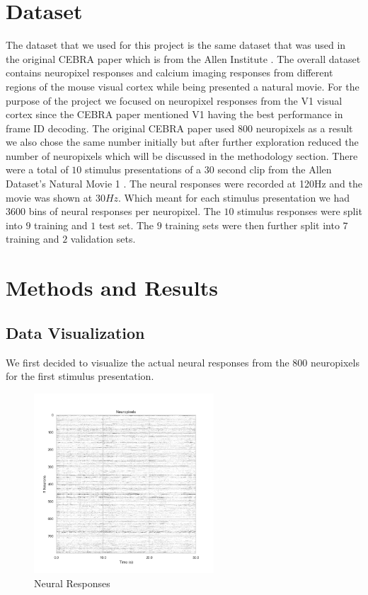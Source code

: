 \documentclass[12pt, letterpaper]{article}
\begin{document}
\section{Dataset}
\label{sec:dataset}
The dataset that we used for this project is the same dataset that was used in the original CEBRA \cite{schneider2023} paper which is from the Allen Institute \cite{siegle2021}. The overall dataset contains neuropixel responses and calcium imaging responses from different regions of the mouse visual cortex while being presented a natural movie. For the purpose of the project we focused on neuropixel responses from the V1 visual cortex since the CEBRA \cite{schneider2023} paper mentioned V1 having the best performance in frame ID decoding. The original CEBRA \cite{schneider2023} paper used $800$ neuropixels as a result we also chose the same number initially but after further exploration reduced the number of neuropixels which will be discussed in the methodology section. There were a total of $10$ stimulus presentations of a $30$ second clip from the Allen Dataset's Natural Movie 1 \cite{siegle2021}. The neural responses were recorded at 120Hz and the movie was shown at $30Hz$. Which meant for each stimulus presentation we had $3600$ bins of neural responses per neuropixel. The $10$ stimulus responses were split into $9$ training and $1$ test set. The $9$ training sets were then further split into $7$ training and $2$ validation sets. 

\section{Methods and Results}
\label{sec:methods_and_results}
\subsection{Data Visualization}
\label{subsec:data_visualization}
We first decided to visualize the actual neural responses from the 800 neuropixels for the first stimulus presentation. 

\begin{figure}[H]
    \centering
    \includegraphics[width=0.6\textwidth]{neuropixels.png}
    \caption{Neural Responses}
    \label{fig:neuropixels}
\end{figure}
\end{document}

